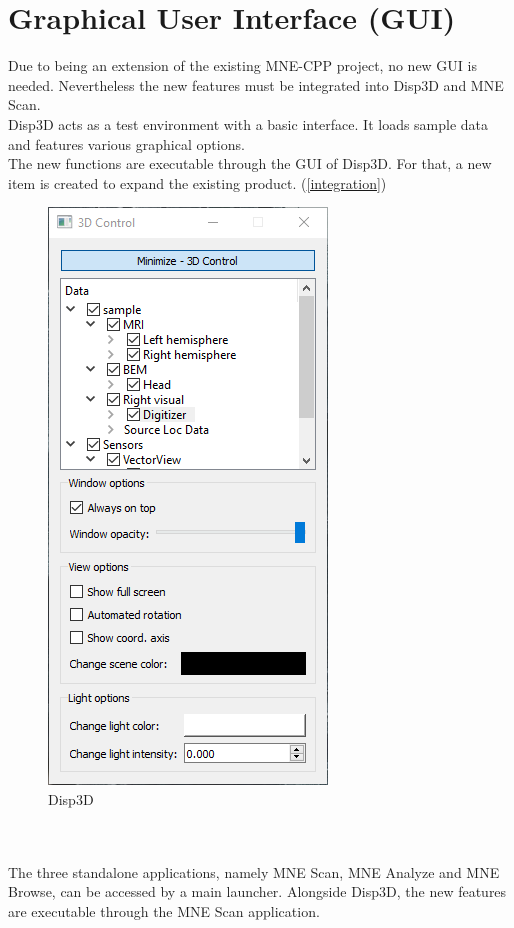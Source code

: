 \section{Graphical User Interface (GUI)}

Due to being an extension of the existing MNE-CPP project, no new GUI is needed. Nevertheless the new features must be integrated into Disp3D and MNE Scan. \\

Disp3D acts as a test environment with a basic interface. It loads sample data and features various graphical options. \\
The new functions are executable through the GUI of Disp3D. For that, a new item is created to expand the existing product. (\ref{integration}) \\ 
	
\begin{figure}
	
	\begin{center}
		
		\includegraphics[scale=0.5]{Figures/Disp3D.PNG}
	
	\end{center}
	
	\caption{Disp3D}

\end{figure}
~\\
~\\
The three standalone applications, namely MNE Scan, MNE Analyze and MNE Browse, can be accessed by a main launcher. Alongside Disp3D, the new features are executable through the MNE Scan application.

